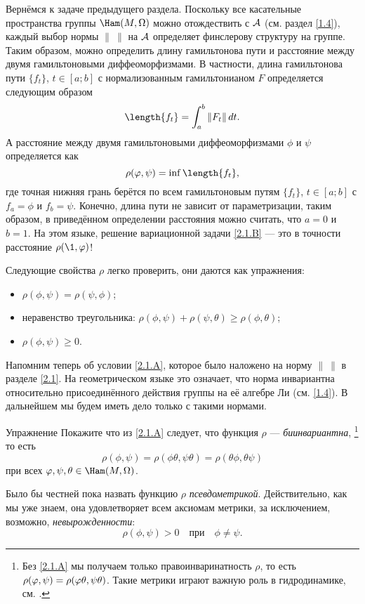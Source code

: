 Вернёмся к задаче предыдущего раздела.
Поскольку все касательные пространства группы $\Ham(M, \Omega)$ можно
отождествить с $\mathcal{A}$ (см. раздел \ref{1.4}), каждый выбор нормы
$\|\ \|$ на $\mathcal{A}$ определяет финслерову структуру на группе.
Таким образом, можно определить длину гамильтонова пути и расстояние между двумя гамильтоновыми диффеоморфизмами.
В частности, длина гамильтонова пути $\{f_t\}$, $t \in [a; b]$ с нормализованным гамильтонианом $F$ определяется следующим образом 
\[\length\{f_t\}=\int_a^b \| F_t \|\,dt.\]
А расстояние между двумя гамильтоновыми диффеоморфизмами $\phi$ и $\psi$ определяется как \index[symb]{$\rho$}
\[\rho (\phi, \psi) = \inf \length \{f_t\},\] 
где точная нижняя грань берётся по всем гамильтоновым путям $\{f_t\}$, $t \in [a; b]$ с $f_a = \phi$ и $f_b = \psi$.
Конечно, длина пути не зависит от параметризации, таким образом, в приведённом определении расстояния можно считать, что $a = 0$ и $b = 1$.
На этом языке, решение вариационной задачи
\ref{2.1.B} — это в точности расстояние $\rho (\1, \phi)$!

Следующие свойства $\rho$ легко проверить,
они даются как упражнения:
\begin{itemize}
\item $\rho (\phi, \psi) = \rho (\psi, \phi)$;
\item неравенство треугольника: $\rho (\phi, \psi) + \rho (\psi, \theta) \ge \rho (\phi, \theta)$;
\item $\rho (\phi, \psi) \ge 0$.
\end{itemize}

Напомним теперь об условии \ref{2.1.A}, которое было наложено на норму $\|\ \|$ в разделе \ref{2.1}.
На геометрическом языке это означает, что норма инвариантна относительно присоединённого действия группы на её алгебре Ли (см. \ref{1.4}).
В дальнейшем мы будем иметь дело только с такими нормами.

\begin{ex*}{Упражнение}
Покажите что из \ref{2.1.A} следует, что функция $\rho$ — \emph{биинвариантна},%
\footnote{Без \ref{2.1.A} мы получаем только правоинваринатность $\rho$, то есть $\rho (\phi, \psi) \z= \rho (\phi\theta, \psi\theta)$.
Такие метрики играют важную роль в гидродинамике, см. \cite{AK}.}
то есть
\[\rho (\phi, \psi) = \rho (\phi \theta, \psi \theta) = \rho (\theta\phi, \theta\psi)\]
при всех $\phi, \psi, \theta \in \Ham (M, \Omega)$.
\end{ex*}

Было бы честней пока назвать функцию $\rho$ \emph{псевдометрикой}.
Действительно, как мы уже знаем, она удовлетворяет всем аксиомам метрики, за исключением, возможно, {}\emph{невырожденности}: 
\begin{equation}
\rho (\phi, \psi)> 0
\quad\text{при}\quad
\phi \ne \psi.
\label{eq:2.2.A}
\end{equation}

